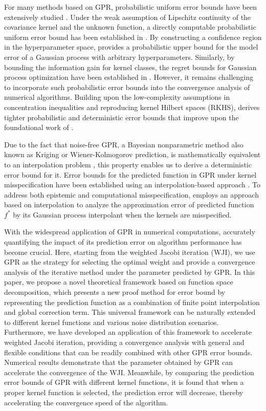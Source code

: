 \documentclass[preprint,review,sort&compress,3p]{elsarticle}
\begin{document}
For many methods based on GPR, probabilistic uniform error bounds have been extensively studied \cite{T-T-F-2023}. Under the weak assumption of Lipschitz continuity of the covariance kernel and the unknown function, a directly computable probabilistic uniform error bound has been established in \cite{A-J-S-2019}. By constructing a confidence region in the hyperparameter space, \cite{A-A-S-2022} provides a probabilistic upper bound for the model error of a Gaussian process with arbitrary hyperparameters. Similarly, by bounding the information gain for kernel classes, the  regret bounds for Gaussian process optimization have been established in \cite{N-A-S-M-2012}. However, it remains challenging to incorporate such probabilistic error bounds into the convergence analysis of numerical algorithms.
Building upon the low-complexity assumptions in concentration inequalities and reproducing kernel Hilbert spaces (RKHS), \cite{R-L-M-2025} derives tighter probabilistic and deterministic error bounds that improve upon the foundational work of \cite{K-A-M-T-D-2022}.

Due to the fact that noise-free GPR, a Bayesian nonparametric method also known as Kriging or Wiener-Kolmogorov prediction, is mathematically equivalent to an interpolation problem \cite{M-P-D-B-2018,S-J-P-E-2023}, this property enables us to derive a deterministic error bound for it.
Error bounds for the predicted function in GPR under kernel misspecification have been established using an interpolation-based approach  \cite{W-B-2022,R-W-2020}.
To address both epistemic and computational misspecification, \cite{D-R-2025} employs an approach based on interpolation to analyze the approximation error of predicted function $f^*$ by its Gaussian process interpolant when the kernels are misspecified.



With the widespread application of GPR in numerical computations, accurately quantifying the impact of its prediction error on algorithm performance has become crucial.
{  Here, starting from the weighted Jacobi iteration (WJI), we use GPR as the strategy for selecting the optimal weight and provide a convergence analysis of the iterative method under the parameter predicted by GPR.}
In this paper, we propose a novel theoretical framework based on function space decomposition, which presents a new proof method for error bound by representing the prediction function as a combination of finite point interpolation and global correction term. 
This universal framework can be naturally extended to different kernel functions and various noise distribution scenarios. 
Furthermore, we have developed an application of this framework to accelerate weighted Jacobi iteration, providing a convergence analysis with general and flexible conditions that can be readily combined with other GPR error bounds.
Numerical results demonstrate that the parameter obtained by GPR can accelerate the convergence of the {  WJI}.  Meanwhile, by comparing the prediction error bounds of GPR with different kernel functions, it is found that when a proper kernel function is selected, the prediction error will decrease, thereby accelerating the convergence speed of the algorithm.
\end{document}

